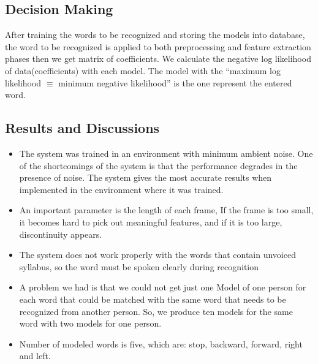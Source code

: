 \documentclass[12pt, a4paper, twoside]{report}
\begin{document}
\subsection{Decision Making}
After training the words to be recognized and storing the models into database, the word to be recognized is applied to both preprocessing and feature extraction phases then we get matrix of coefficients.
We calculate the negative log likelihood of data(coefficients) with each model. 
The model with the ``maximum log likelihood $\equiv$ minimum negative likelihood'' is the one represent the entered word.
\subsection{Results and Discussions}
\begin{itemize}[noitemsep]
\item The system was trained in an environment with minimum ambient noise. One of the shortcomings of the system is that the performance degrades in the presence of noise. The system gives the most accurate results when implemented in the environment where it was trained.
\item An important parameter is the length of each frame, If the frame is too small, it becomes hard to pick out meaningful features, and if it is too large, discontinuity appears.
\item The system does not work properly with the words that contain unvoiced syllabus, so the word must be spoken clearly during recognition 
\item A problem we had is that we could not get just one Model of one person for each word that could be matched with the same word that needs to be recognized from another person. So, we produce ten models for the same word with two models for one person. 
\item Number of modeled words is five, which are: stop, backward, forward, right and left.
\end{itemize}
\end{document}
